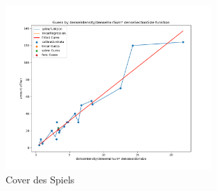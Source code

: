 \documentclass[german,a4paper, 12pt]{scrartcl}
\begin{document}
\begin{figure}
	\centering
	\includegraphics[width=0.7\textwidth]{figBina/g12.png}
	\caption[]{Cover des Spiels}
	\label{img:Bina01}
\end{figure}



\printbibliography
\end{document}

